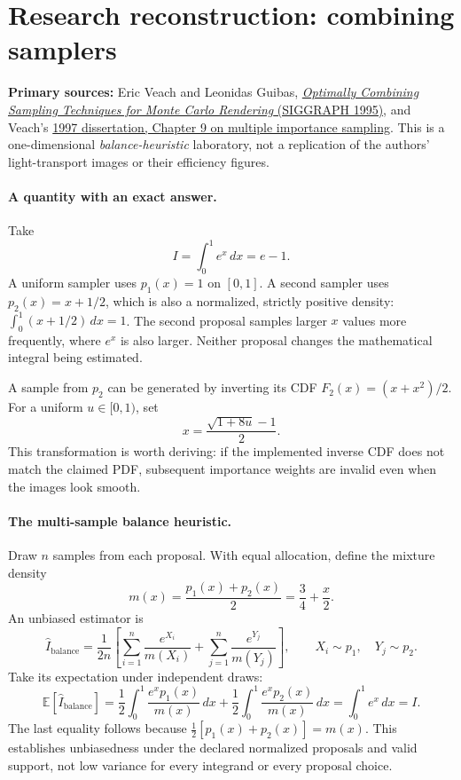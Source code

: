 \clearpage
\section*{Research reconstruction: combining samplers}
\noindent\textbf{Primary sources:}
Eric Veach and Leonidas Guibas,
\href{https://lightfield.stanford.edu/papers/combine/}
{\emph{Optimally Combining Sampling Techniques for Monte Carlo Rendering}
(SIGGRAPH 1995)}, and Veach's
\href{https://graphics.stanford.edu/papers/veach_thesis/}
{1997 dissertation, Chapter 9 on multiple importance sampling}.
This is a one-dimensional \emph{balance-heuristic}
laboratory, not a replication of the authors' light-transport
images or their efficiency figures.

\paragraph{A quantity with an exact answer.}
Take
\[
I=\int_0^1 e^x\,dx=e-1.
\]
A uniform sampler uses \(p_1(x)=1\) on \([0,1]\).
A second sampler uses \(p_2(x)=x+1/2\), which is also
a normalized, strictly positive density:
\(\int_0^1(x+1/2)\,dx=1\).
The second proposal samples larger \(x\) values more
frequently, where \(e^x\) is also larger. Neither proposal
changes the mathematical integral being estimated.

A sample from \(p_2\) can be generated by inverting its
CDF \(F_2(x)=(x+x^2)/2\). For a uniform
\(u\in[0,1)\), set
\[
x=\frac{\sqrt{1+8u}-1}{2}.
\]
This transformation is worth deriving: if the implemented
inverse CDF does not match the claimed PDF, subsequent
importance weights are invalid even when the images look smooth.

\paragraph{The multi-sample balance heuristic.}
Draw \(n\) samples from each proposal.
With equal allocation, define the mixture density
\[
m(x)=\frac{p_1(x)+p_2(x)}2=\frac34+\frac x2.
\]
An unbiased estimator is
\[
\widehat I_{\mathrm{balance}}
=\frac1{2n}\left[
\sum_{i=1}^n\frac{e^{X_i}}{m(X_i)}
+\sum_{j=1}^n\frac{e^{Y_j}}{m(Y_j)}
\right],\qquad
X_i\sim p_1,\quad Y_j\sim p_2.
\]
Take its expectation under independent draws:
\[
\mathbb E[\widehat I_{\mathrm{balance}}]
=\frac12\int_0^1\frac{e^x p_1(x)}{m(x)}\,dx
+\frac12\int_0^1\frac{e^x p_2(x)}{m(x)}\,dx
=\int_0^1 e^x\,dx=I.
\]
The last equality follows because
\(\frac12[p_1(x)+p_2(x)]=m(x)\).
This establishes unbiasedness under the declared normalized
proposals and valid support, not low variance for every
integrand or every proposal choice.

